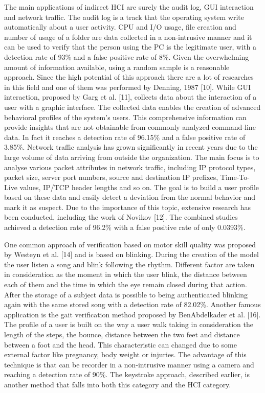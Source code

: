 \documentclass[12pt]{report}
\begin{document}
The main applications of indirect HCI are surely the audit log, GUI interaction and network traffic.
The audit log is a track that the operating system write automatically about a user activity.
CPU and I/O usage, file creation and number of usage of a folder are data collected in a non-intrusive manner and it can be used to verify that the person using the PC is the legitimate user, with a detection rate of 93\% and a false positive rate of 8\%.
Given the overwhelming amount of information available, using a random sample is a reasonable approach.
Since the high potential of this approach there are a lot of researches in this field and one of them was performed by Denning, 1987 [10].
While GUI interaction, proposed by  Garg et al. [11], collects data about the interaction of a user with a graphic interface.
The collected data enables the creation of advanced behavioral profiles of the system's users. 
This comprehensive information can provide insights that are not obtainable from commonly analyzed command-line data.
In fact it reaches a detection rate of 96.15\% and a false positive rate of 3.85\%.
Network traffic analysis has grown significantly in recent years due to the large volume of data arriving from outside the organization. 
The main focus is to analyse various packet attributes in network traffic, including IP protocol types, packet size, server port numbers, source and destination IP prefixes, Time-To-Live values, IP/TCP header lengths and so on. 
The goal is to build a user profile based on these data and easily detect a deviation from the normal behavior and mark it as suspect.
Due to the importance of this topic, extensive research has been conducted, including the work of Novikov [12]. 
The combined studies achieved a detection rate of 96.2\% with a false positive rate of only 0.0393\%.

One common approach of verification based on motor skill quality was proposed by Westeyn et al. [14] and is based on blinking. 
During the creation of the model the user listen a song and blink following the rhythm. 
Different factor are taken in consideration as the moment in which the user blink, the distance between each of them and the time in which the eye remain closed during that action. 
After the storage of a subject data is possible to being authenticated blinking again with the same stored song with a detection rate of 82.02\%.
Another famous application is the gait verification method proposed by BenAbdelkader et al. [16].
The profile of a user is built on the way a user walk taking in consideration the length of the steps, the bounce, distance between the two feet and distance between a foot and the head. 
This characteristic can changed due to some external factor like pregnancy, body weight or injuries. 
The advantage of this technique is that can be recorder in a non-intrusive manner using a camera and reaching a detection rate of 90\%.
The keystroke approach, described earlier, is another method that falls into both this category and the HCI category.
\end{document}
